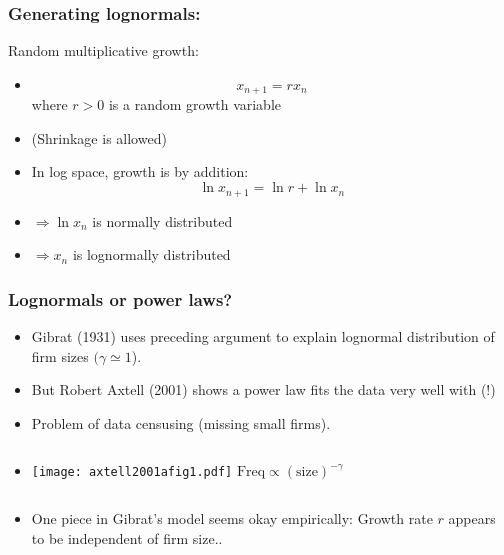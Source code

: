 \begin{frame}
  \frametitle{Generating lognormals:}

  \begin{block}{Random multiplicative growth:}
    \begin{itemize}
    \item<1->
      $$ x_{n+1} = r x_n$$
      where $r>0$ is a random growth variable
    \item<2-> (Shrinkage is allowed)
    \item<3->
      In log space, growth is by addition:
      $$ \ln x_{n+1} = \ln r + \ln x_n $$
    \item<4->
      $\Rightarrow \ln x_{n}$ is normally distributed
    \item<5->  
      $\Rightarrow x_{n}$ is lognormally distributed
    \end{itemize}
    
  \end{block}

\end{frame}

\begin{frame}
  \frametitle{Lognormals or power laws?}

  
  \begin{block}{}
  \begin{itemize}
  \item<1-> Gibrat\cite{gibrat1931a} (1931) uses preceding argument
    to explain lognormal distribution of firm sizes $(\gamma \simeq 1$).
  \item<2-> But Robert Axtell\cite{axtell2001a} (2001) shows a power
    law fits the data very well with  (!)
  \item<3-> Problem of data censusing (missing small firms).
  \item<4->
    \begin{overprint}
      \begin{columns}
        \texttt{[image: axtell2001afig1.pdf]}
        $ \mbox{Freq} \propto (\mbox{size})^{-\gamma}$
        \medskip
      \end{columns}
    \end{overprint}
  \item<5->
    One piece in Gibrat's model seems okay empirically: 
    Growth rate $r$ appears to be independent of firm size.\cite{axtell2001a}.
  \end{itemize}
  \end{block}

\end{frame}


